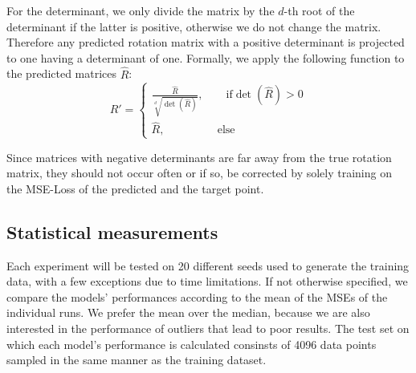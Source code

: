 For the determinant, we only divide the matrix by the $d$-th root of the determinant if the latter is positive, otherwise we do not change the matrix. Therefore any predicted rotation matrix with a positive determinant is projected to one having a determinant of one. Formally, we apply the following function to the predicted matrices $\hat{R}$:
\begin{equation}
\hat{R}' = \begin{cases} \frac{\hat{R}}{\sqrt[d]{\det(\hat{R})}}, \qquad \text{if} \det(\hat{R}) > 0 \\ \hat{R}, \qquad \qquad \,\,\,\,\text{else} \end{cases}
\label{eq:norm_det}
\end{equation}

Since matrices with negative determinants are far away from the true rotation matrix, they should not occur often or if so, be corrected by solely training on the MSE-Loss of the predicted and the target point. 

\subsection{Statistical measurements}
Each experiment will be tested on 20 different seeds used to generate the training data, with a few exceptions due to time limitations. If not otherwise specified, we compare the models' performances according to the mean of the MSEs of the individual runs. We prefer the mean over the median, because we are also interested in the performance of outliers that lead to poor results. The test set on which each model's performance is calculated consinsts of 4096 data points sampled in the same manner as the training dataset.\\



\[   \]








\clearpage

